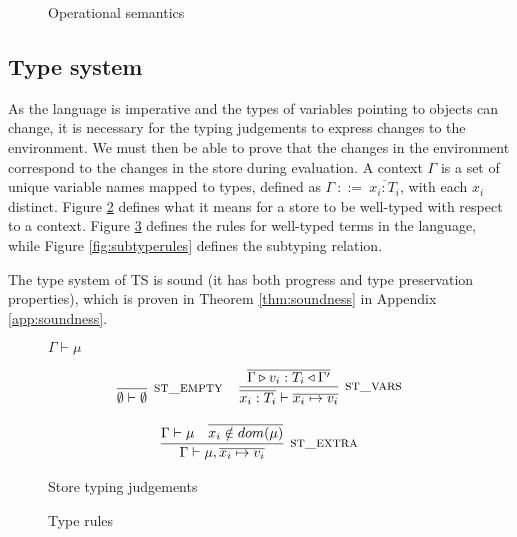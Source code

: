 \documentclass[preprint]{sigplanconf}
\newcommand{\figref}[1]{Figure \ref{#1}}
\newcommand{\appref}[1]{Appendix \ref{#1}}
\newcommand{\thmref}[1]{Theorem \ref{#1}}
\newcommand{\typerule}[4]{#1 \triangleright #2 : #3 \triangleleft #4}
\begin{document}
\begin{figure}

\ottdefnreduce

\caption{\label{fig:opsemantics} Operational semantics}
\end{figure}

\subsection{Type system}

As the language is imperative and the types of variables pointing to objects can
change, it is necessary for the typing judgements to express changes to the 
environment. We must then be able
to prove that the changes in the environment correspond to the changes in the
store during evaluation. A context $\Gamma$ is a set of unique variable names 
mapped to types, defined as $\Gamma\:\mathrm{::=}\:\overline{x_i : T_i}$,
with each $x_i$ distinct. \figref{fig:storetype} defines what it means for
a store to be well-typed with respect to a
context. \figref{fig:typerules} defines the rules for well-typed terms
in the language, while \figref{fig:subtyperules} defines the subtyping
relation.

The type system of TS is sound (it has both progress and type preservation
properties), which is proven in \thmref{thm:soundness} in 
\appref{app:soundness}.

\begin{figure}
\begin{ottdefnblock}
{$\Gamma  \vdash  \mu$}
{}
\end{ottdefnblock}

\[
\begin{tabular}{cc}
\infer[\textsc{st\_empty}]
{\emptyset \vdash \emptyset}
{}
&
\infer[\textsc{st\_vars}]
{\overline{x_i : T_i} \vdash \overline{x_i \mapsto v_i}}
{\overline{\typerule{\Gamma}{v_i}{T_i}{\Gamma'}}}
\\\\
\multicolumn{2}{c}{
\infer[\textsc{st\_extra}]
{\Gamma \vdash \mu, \overline{x_i \mapsto v_i}}
{\Gamma \vdash \mu & \overline{x_i \notin dom(\mu)}}
}
\end{tabular}
\]

\caption{\label{fig:storetype} Store typing judgements}
\end{figure}

\begin{figure}
\ottdefnmethtype

\ottdefntype

\caption{\label{fig:typerules} Type rules}
\end{figure}
\end{document}
